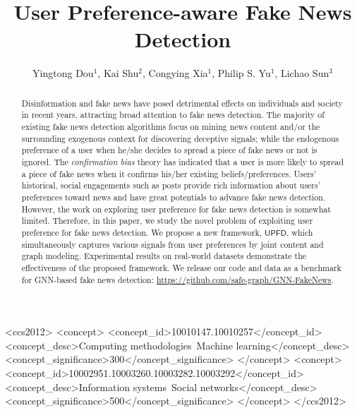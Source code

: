 \documentclass[sigconf]{acmart}
\newcommand\UPFD{$\mathsf{UPFD}$\xspace}
\begin{document}
\title{User Preference-aware Fake News Detection}



\author{Yingtong Dou$^{1}$, Kai Shu$^{2}$, Congying Xia$^{1}$, Philip S. Yu$^{1}$, Lichao Sun$^{3}$}









\begin{abstract}


Disinformation and fake news have posed detrimental effects on individuals and society in recent years, attracting broad attention to fake news detection. 
The majority of existing fake news detection algorithms focus on mining news content and/or the surrounding exogenous context for discovering deceptive signals;
while the endogenous preference of a user when he/she decides to spread a piece of fake news or not is ignored.
The \textit{confirmation bias} theory has indicated that a user is more likely to spread a piece of fake news when it confirms his/her existing beliefs/preferences.
Users' historical, social engagements such as posts provide rich information about users' preferences toward news and have great potentials to advance fake news detection.
However, the work on exploring user preference for fake news detection is somewhat limited.
Therefore, in this paper, we study the novel problem of exploiting user preference for fake news detection.
We propose a new framework, \UPFD, which simultaneously captures various signals from user preferences by joint content and graph modeling.
Experimental results on real-world datasets demonstrate the effectiveness of the proposed framework.
We release our code and data as a benchmark for GNN-based fake news detection: \url{https://github.com/safe-graph/GNN-FakeNews}.
\end{abstract}


\begin{CCSXML}
<ccs2012>
   <concept>
       <concept_id>10010147.10010257</concept_id>
       <concept_desc>Computing methodologies~Machine learning</concept_desc>
       <concept_significance>300</concept_significance>
       </concept>
   <concept>
       <concept_id>10002951.10003260.10003282.10003292</concept_id>
       <concept_desc>Information systems~Social networks</concept_desc>
       <concept_significance>500</concept_significance>
       </concept>
 </ccs2012>
\end{CCSXML}
\end{document}
